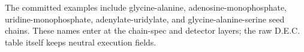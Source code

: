 The committed examples include glycine-alanine, adenosine-monophosphate, uridine-monophosphate, adenylate-uridylate, and glycine-alanine-serine seed chains. These names enter at the chain-spec and detector layers; the raw D.E.C. table itself keeps neutral execution fields.

